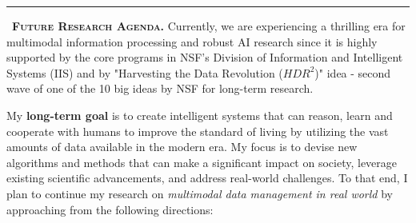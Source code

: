 \noindent\rule{2cm}{4pt}~\textbf{\textsc{Future Research Agenda.}}
Currently, we are experiencing a thrilling era for multimodal information processing and robust AI research since it is highly supported by the core programs in NSF's Division of Information and Intelligent Systems (IIS) and by "Harvesting the Data Revolution ($HDR^2$)" idea - second wave of one of the 10 big ideas
by NSF for long-term research.


My \textbf{long-term goal} is to create intelligent systems that can reason, learn and cooperate with humans to improve the standard of living by utilizing the vast amounts of data available in the modern era. My focus is to devise new algorithms and methods that can make a significant impact on society, leverage existing scientific advancements, and address real-world challenges. To that end, I
plan to continue my research on \textit{multimodal data management in real world} by approaching from the following directions:

